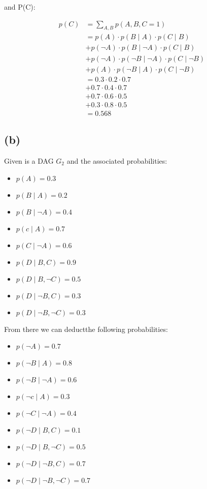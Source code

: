 \documentclass{article}
\begin{document}
and P(C):

\begin{align*}
    p(C)    &= \sum_{A,B}^{} p(A,B,C=1) \\
            &= p(A) \cdot p(B \mid A) \cdot p(C \mid B) \\
            &+ p(\neg A) \cdot p(B \mid \neg A) \cdot p(C \mid B) \\
            &+ p(\neg A) \cdot p(\neg B \mid \neg A) \cdot p(C \mid \neg B) \\
            &+ p( A) \cdot p(\neg B \mid  A) \cdot p( C \mid \neg B) \\
            &= 0.3 \cdot 0.2 \cdot 0.7 \\
            &+ 0.7 \cdot 0.4 \cdot 0.7 \\
            &+ 0.7 \cdot 0.6 \cdot 0.5 \\
            &+ 0.3 \cdot 0.8 \cdot 0.5 \\
            &= 0.568
\end{align*}

\subsection*{(b)}
Given is a DAG $G_2$ and the associated probabilities:
\begin{itemize}
    \item $p(A)=0.3$
    \item $p(B \mid A)= 0.2$
    \item $p(B \mid \neg A) = 0.4$
    \item $p(c \mid A)= 0.7$
    \item $p(C \mid \neg A)= 0.6$
    \item $p(D \mid B,C)=0.9$
    \item $p(D \mid B, \neg C)=0.5$
    \item $p(D \mid \neg B, C)=0.3$
    \item $p(D \mid \neg B, \neg C)= 0.3$
\end{itemize}

From there we can deductthe following probabilities:
\begin{itemize}
    \item $p(\neg A)=0.7$
    \item $p(\neg B \mid A)= 0.8$
    \item $p(\neg B \mid \neg A) = 0.6$
    \item $p(\neg c \mid A)= 0.3$
    \item $p(\neg C \mid \neg A)= 0.4$
    \item $p(\neg D \mid B,C)=0.1$
    \item $p(\neg D \mid B, \neg C)=0.5$
    \item $p(\neg D \mid \neg B, C)=0.7$
    \item $p(\neg D \mid \neg B, \neg C)= 0.7$
\end{itemize}
\end{document}
